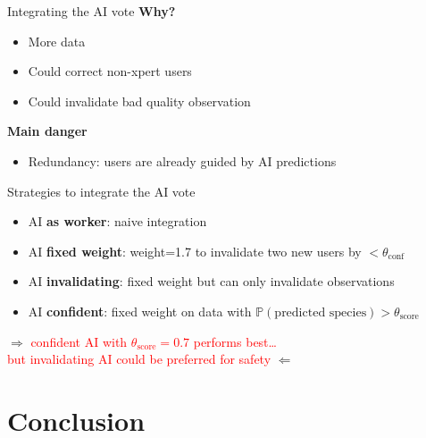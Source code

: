 \begin{frame}{Integrating the AI vote}{}
\textbf{Why?}
\begin{itemize}
    \item More data
    \item Could correct non-xpert users
    \item Could invalidate bad quality observation
\end{itemize}
\pause
\vspace{2cm}
\textbf{Main danger}
\begin{itemize}
    \item Redundancy: users are already guided by AI predictions
\end{itemize}

\end{frame}

\begin{frame}{Strategies to integrate the AI vote}{}
\begin{itemize}
    \item AI \textbf{as worker}: naive integration
    \item AI \textbf{fixed weight}: weight=1.7 to invalidate two new users by $<\theta_{\text{conf}}$
    \item AI \textbf{invalidating}: fixed weight but can only invalidate observations
    \item AI \textbf{confident}: fixed weight on data with $\mathbb{P}(\text{predicted species}) > \theta_{\text{score}}$
\end{itemize}
\pause
\vspace{1cm}
\begin{center}
$\Longrightarrow$ \textcolor{red}{confident AI with $\theta_{\text{score}}=0.7$ performs best\dots \\ but invalidating AI could be preferred for safety} $\Longleftarrow$
\end{center}
\end{frame}

\section{Conclusion}

